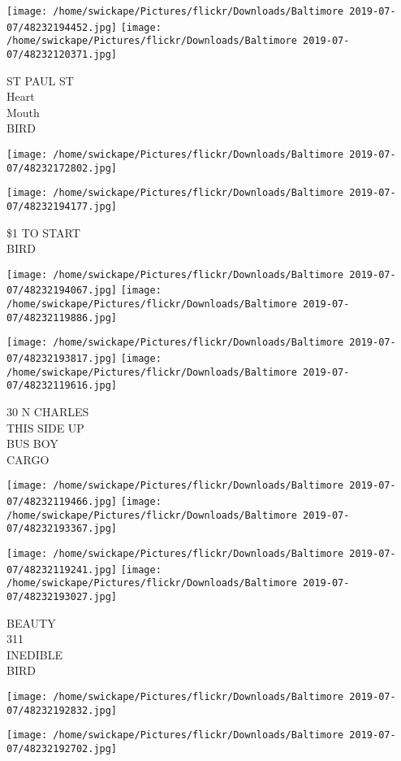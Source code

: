 \documentclass[10pt,letterpaper]{article}
\begin{document}
\texttt{[image: /home/swickape/Pictures/flickr/Downloads/Baltimore 2019-07-07/48232194452.jpg]}
\texttt{[image: /home/swickape/Pictures/flickr/Downloads/Baltimore 2019-07-07/48232120371.jpg]}

ST PAUL ST\\
Heart\\
Mouth\\
BIRD
\pagebreak

\texttt{[image: /home/swickape/Pictures/flickr/Downloads/Baltimore 2019-07-07/48232172802.jpg]}

\vspace{0.25in}
\texttt{[image: /home/swickape/Pictures/flickr/Downloads/Baltimore 2019-07-07/48232194177.jpg]}

\$1 TO START\\
BIRD
\pagebreak

\texttt{[image: /home/swickape/Pictures/flickr/Downloads/Baltimore 2019-07-07/48232194067.jpg]}
\texttt{[image: /home/swickape/Pictures/flickr/Downloads/Baltimore 2019-07-07/48232119886.jpg]}

\texttt{[image: /home/swickape/Pictures/flickr/Downloads/Baltimore 2019-07-07/48232193817.jpg]}
\texttt{[image: /home/swickape/Pictures/flickr/Downloads/Baltimore 2019-07-07/48232119616.jpg]}

30 N CHARLES\\
THIS SIDE UP\\
BUS BOY\\
CARGO
\pagebreak

\texttt{[image: /home/swickape/Pictures/flickr/Downloads/Baltimore 2019-07-07/48232119466.jpg]}
\texttt{[image: /home/swickape/Pictures/flickr/Downloads/Baltimore 2019-07-07/48232193367.jpg]}

\texttt{[image: /home/swickape/Pictures/flickr/Downloads/Baltimore 2019-07-07/48232119241.jpg]}
\texttt{[image: /home/swickape/Pictures/flickr/Downloads/Baltimore 2019-07-07/48232193027.jpg]}

BEAUTY\\
311\\
INEDIBLE\\
BIRD
\pagebreak

\texttt{[image: /home/swickape/Pictures/flickr/Downloads/Baltimore 2019-07-07/48232192832.jpg]}

\vspace{0.25in}
\texttt{[image: /home/swickape/Pictures/flickr/Downloads/Baltimore 2019-07-07/48232192702.jpg]}
\end{document}
